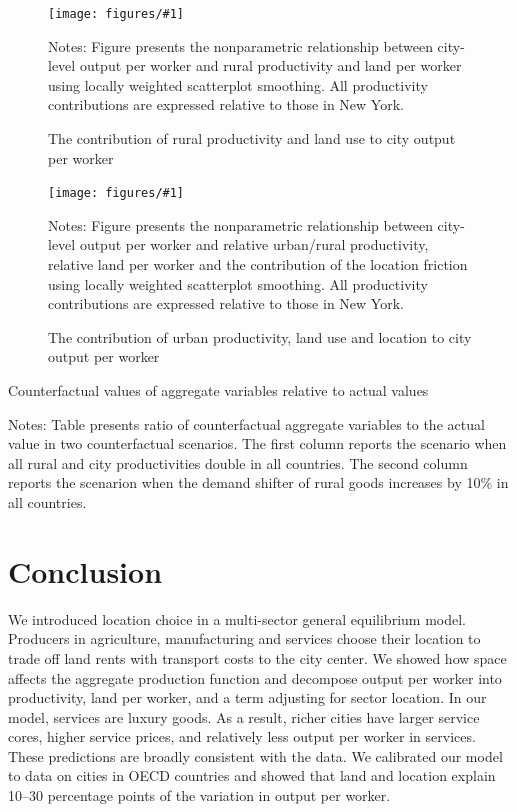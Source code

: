 \documentclass[12pt]{article}
\newcommand{\dofigure}[3]{\begin{figure}
\begin{centering}
\texttt{[image: figures/\#1]}
  \caption{#2\label{fig:#1}}
\end{centering}

\noindent \footnotesize{#3}
\end{figure}}
\begin{document}
\dofigure{../../research_designs/city_level_inputs/output/rural_contributions}{The contribution of rural productivity and land use to city output per worker}{Notes: Figure presents the nonparametric relationship between city-level output per worker and rural productivity and land per worker using locally weighted scatterplot smoothing. All productivity contributions are expressed relative to those in New York.}

\dofigure{../../research_designs/city_level_inputs/output/urban_contributions}{The contribution of urban productivity, land use and location to city output per worker}{Notes: Figure presents the nonparametric relationship between city-level output per worker and relative urban/rural productivity, relative land per worker and the contribution of the location friction using locally weighted scatterplot smoothing. All productivity contributions are expressed relative to those in New York.}

\begin{table}[h!]
  \begin{center}
  \caption{Counterfactual values of aggregate variables relative to actual values\label{tab:counterfactuals}}
  
  \end{center}
  \noindent \footnotesize{Notes: Table presents ratio of counterfactual aggregate variables to the actual value in two counterfactual scenarios. The first column reports the scenario when all rural and city productivities double in all countries. The second column reports the scenarion when the demand shifter of rural goods increases by 10\% in all countries.}
\end{table}


\section{Conclusion}
We introduced location choice in a multi-sector general equilibrium model. Producers in agriculture, manufacturing and services choose their location to trade off land rents with transport costs to the city center. We showed how space affects the aggregate production function and decompose output per worker into productivity, land per worker, and a term adjusting for sector location. In our model, services are luxury goods. As a result, richer cities have larger service cores, higher service prices, and relatively less output per worker in services. These predictions are broadly consistent with the data. We calibrated our model to data on cities in OECD countries and showed that land and location explain 10--30 percentage points of the variation in output per worker.
\end{document}
